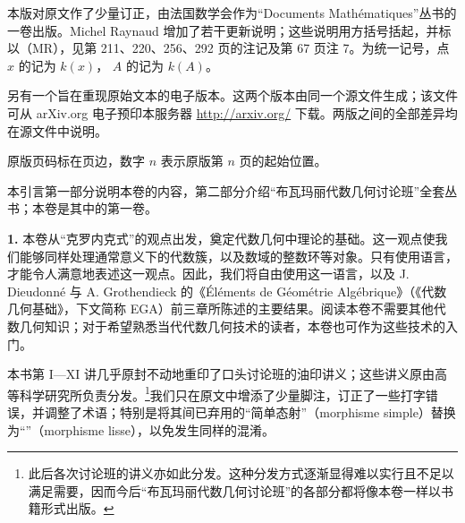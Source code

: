 本版对原文作了少量订正，由法国数学会作为“Documents Mathématiques”丛书的一卷出版。Michel Raynaud 增加了若干更新说明；这些说明用方括号括起，并标以（MR），见第 211、220、256、292 页的注记及第 67 页注 7。为统一记号，点 $x$ 的记为 $k(x)$， $A$ 的记为 $k(A)$。

另有一个旨在重现原始文本的电子版本。这两个版本由同一个源文件生成；该文件可从 arXiv.org 电子预印本服务器 \url{http://arxiv.org/} 下载。两版之间的全部差异均在源文件中说明。

原版页码标在页边，数字 $n$ 表示原版第 $n$ 页的起始位置。

本引言第一部分说明本卷的内容，第二部分介绍“布瓦玛丽代数几何讨论班”全套丛书；本卷是其中的第一卷。

\textbf{1.} 本卷从“克罗内克式”的观点出发，奠定代数几何中理论的基础。这一观点使我们能够同样处理通常意义下的代数簇，以及数域的整数环等对象。只有使用语言，才能令人满意地表述这一观点。因此，我们将自由使用这一语言，以及 J. Dieudonné 与 A. Grothendieck 的《Éléments de Géométrie Algébrique》（《代数几何基础》，下文简称 EGA）前三章所陈述的主要结果。阅读本卷不需要其他代数几何知识；对于希望熟悉当代代数几何技术的读者，本卷也可作为这些技术的入门。

本书第 I—XI 讲几乎原封不动地重印了口头讨论班的油印讲义；这些讲义原由高等科学研究所负责分发。\footnote{此后各次讨论班的讲义亦如此分发。这种分发方式逐渐显得难以实行且不足以满足需要，因而今后“布瓦玛丽代数几何讨论班”的各部分都将像本卷一样以书籍形式出版。}我们只在原文中增添了少量脚注，订正了一些打字错误，并调整了术语；特别是将其间已弃用的“简单态射”（morphisme simple）替换为“”（morphisme lisse），以免发生同样的混淆。

